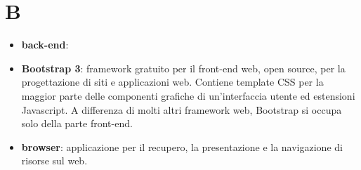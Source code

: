 \section{B}
\begin{itemize} 
	\item \textbf{back-end}:
	\item \textbf{Bootstrap 3}: framework gratuito per il front-end web, open source, per la progettazione di siti e applicazioni web. Contiene template CSS per la maggior parte delle componenti grafiche di un'interfaccia utente ed estensioni Javascript. A differenza di molti altri framework web, Bootstrap si occupa solo della parte front-end.
	\item \textbf{browser}: applicazione per il recupero, la presentazione e la navigazione di risorse sul web.
\end{itemize}